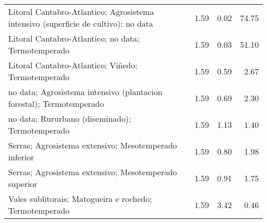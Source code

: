 \begin{table}[p]
\begin{tabular}{lrrr}
  Litoral Cantabro-Atlantico; Agrosistema intensivo (superficie de cultivo); no data & 1.59 & 0.02 & 74.75 \\ 
  Litoral Cantabro-Atlantico; no data; Termotemperado & 1.59 & 0.03 & 51.10 \\ 
  Litoral Cantabro-Atlantico; Viñedo; Termotemperado & 1.59 & 0.59 & 2.67 \\ 
  no data; Agrosistema intensivo (plantacion forestal); Termotemperado & 1.59 & 0.69 & 2.30 \\ 
  no data; Rururbano (diseminado); Termotemperado & 1.59 & 1.13 & 1.40 \\ 
  Serras; Agrosistema extensivo; Mesotemperado inferior & 1.59 & 0.80 & 1.98 \\ 
  Serras; Agrosistema extensivo; Mesotemperado superior & 1.59 & 0.91 & 1.75 \\ 
  Vales sublitorais; Matogueira e rochedo; Termotemperado & 1.59 & 3.42 & 0.46 \\ 
   \hline
\end{tabular}
\end{table}

